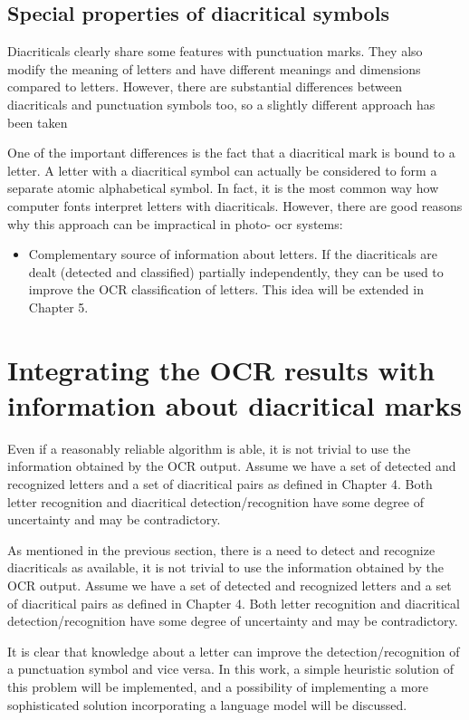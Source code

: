 \documentclass[12pt,a4paper]{report}
\begin{document}
\subsection{Special properties of diacritical symbols}
Diacriticals clearly share some features with punctuation marks. They also modify the meaning of letters and have different meanings and dimensions compared to letters. However, there are substantial differences between diacriticals and punctuation symbols too, so a slightly different approach has been taken

One of the important differences is the fact that a diacritical mark is bound to a letter. A letter with a diacritical symbol can actually be considered to form a separate atomic alphabetical symbol. In fact, it is the most common way how computer fonts interpret letters with diacriticals. However, there are good reasons why this approach can be impractical in photo- ocr systems:
\begin{itemize}
    \item Complementary source of information about letters. If the diacriticals are dealt (detected and classified) partially independently, they can be used to improve the OCR classification of letters. This idea will be extended in Chapter 5.
\end{itemize}

\section{Integrating the OCR results with information about diacritical marks}
Even if a reasonably reliable algorithm is able, it is not trivial to use the information obtained by the OCR output. Assume we have a set of detected and recognized letters and a set of diacritical pairs as defined in Chapter 4. Both letter recognition and diacritical detection/recognition have some degree of uncertainty and may be contradictory.

As mentioned in the previous section, there is a need to detect and recognize diacriticals as available, it is not trivial to use the information obtained by the OCR output. Assume we have a set of detected and recognized letters and a set of diacritical pairs as defined in Chapter 4. Both letter recognition and diacritical detection/recognition have some degree of uncertainty and may be contradictory.

It is clear that knowledge about a letter can improve the detection/recognition of a punctuation symbol and vice versa. In this work, a simple heuristic solution of this problem will be implemented, and a possibility of implementing a more sophisticated solution incorporating a language model will be discussed.
\end{document}
